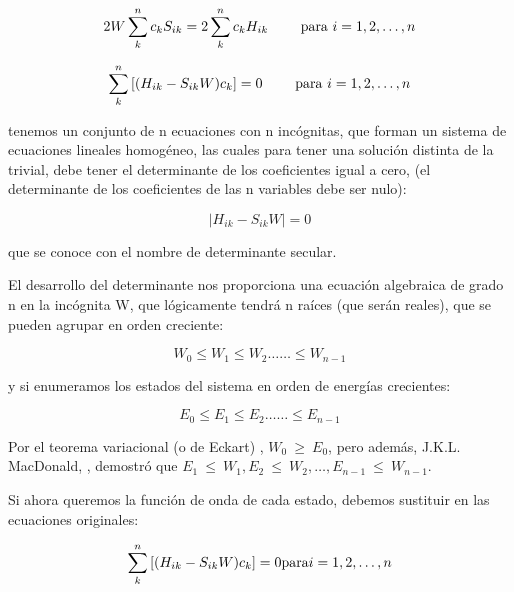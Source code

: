 \documentclass[a4paper,openright,12pt, oneside]{book}
\begin{document}
\begin{displaymath}2 W \sum^{n}_{k} c_{k} S_{ik} = 2 \sum^{n}_{k} c_{k} H_{ik}\qquad \hbox{
para }i = 1,2,\ldots ,n \end{displaymath}



\begin{displaymath}\sum^{n}_{k} \left[(H_{ik} - S_{ik} W ) c_{k} \right] = 0 \qquad
\hbox{ para } i = 1,2,\ldots ,n \end{displaymath}

tenemos un conjunto de n ecuaciones con n inc\'ognitas, que forman un sistema de ecuaciones lineales homog\'eneo, las cuales para tener una soluci\'on distinta de la trivial, debe tener el determinante de los coeficientes igual a cero, (el determinante de los coeficientes de las n variables debe ser nulo):



\begin{displaymath}\mid H_{ik} - S_{ik} W\mid = 0 \end{displaymath}

que se conoce con el nombre de determinante secular.

El desarrollo del determinante nos proporciona una ecuaci\'on algebraica de grado n en la inc\'ognita W, que l\'ogicamente tendr\'a n ra\'ices (que ser\'an reales), que se pueden agrupar en orden creciente:



\begin{displaymath}W_{0} \le W_{1} \le W_{2} \ldots \ldots \le W_{n-1} \end{displaymath}

y si enumeramos los estados del sistema en orden de energías crecientes:

\begin{displaymath}E_{0} \le E_{1} \le E_{2} \ldots \ldots \le E_{n-1} \end{displaymath}

Por el teorema variacional (o de Eckart) ,  $W_{0}~\ge ~E_{0}$, pero adem\'as, J.K.L. MacDonald, \cite{macdonald}, demostr\'o que  $E_{1}~\le ~W_{1}, E_{2}~\le ~W_{2},
\ldots , E_{n-1}~\le ~W_{n-1}$.

Si ahora queremos la funci\'on de onda de cada estado, debemos sustituir en las ecuaciones originales:

\begin{displaymath}
\sum^{n}_{k} \left[{(H_{ik} - S_{ik} W) c_{k}}\right] =
0\hbox{para}i = 1,2,\ldots ,n
\end{displaymath}
\end{document}
